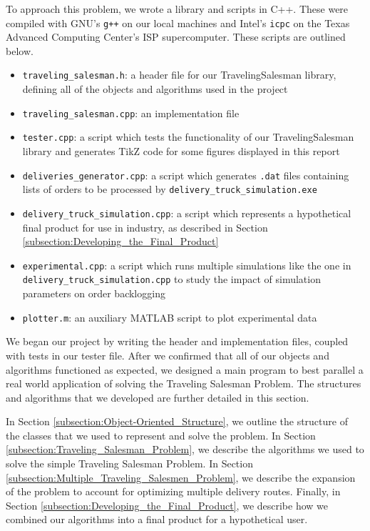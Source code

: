 \documentclass[letterpaper]{article}
\begin{document}
    To approach this problem, we wrote a library and scripts in C++. These were compiled with GNU's \verb|g++| on our local machines and Intel's \verb|icpc| on the Texas Advanced Computing Center's ISP supercomputer. These scripts are outlined below.
    \begin{itemize}
        \item \verb|traveling_salesman.h|: a header file for our TravelingSalesman library, defining all of the objects and algorithms used in the project
        \item \verb|traveling_salesman.cpp|: an implementation file
        \item \verb|tester.cpp|: a script which tests the functionality of our TravelingSalesman library and generates TikZ code for some figures displayed in this report
        \item \verb|deliveries_generator.cpp|: a script which generates \verb|.dat| files containing lists of orders to be processed by \verb|delivery_truck_simulation.exe|
        \item \verb|delivery_truck_simulation.cpp|: a script which represents a hypothetical final product for use in industry, as described in Section \ref{subsection:Developing_the_Final_Product}
        \item \verb|experimental.cpp|: a script which runs multiple simulations like the one in \verb|delivery_truck_simulation.cpp| to study the impact of simulation parameters on order backlogging
        \item \verb|plotter.m|: an auxiliary MATLAB script to plot experimental data
    \end{itemize}

    We began our project by writing the header and implementation files, coupled with tests in our tester file. After we confirmed that all of our objects and algorithms functioned as expected, we designed a main program to best parallel a real world application of solving the Traveling Salesman Problem. The structures and algorithms that we developed are further detailed in this section.

    In Section \ref{subsection:Object-Oriented_Structure}, we outline the structure of the classes that we used to represent and solve the problem. In Section \ref{subsection:Traveling_Salesman_Problem}, we describe the algorithms we used to solve the simple Traveling Salesman Problem. In Section \ref{subsection:Multiple_Traveling_Salesmen_Problem}, we describe the expansion of the problem to account for optimizing multiple delivery routes. Finally, in Section \ref{subsection:Developing_the_Final_Product}, we describe how we combined our algorithms into a final product for a hypothetical user.
\end{document}
